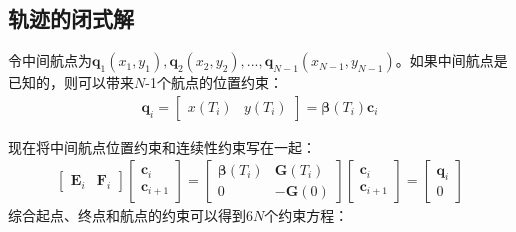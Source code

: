 \documentclass[master,academic]{ysuthesis} %
\begin{document}
		\subsection{轨迹的闭式解} 
		令中间航点为$\bm{q}_1(x_1,y_1),\bm{q}_2(x_2,y_2),...,\bm{q}_{N-1}(x_{N-1},y_{N-1})$。如果中间航点是已知的，则可以带来$N$-1个航点的位置约束：
		\begin{equation}
			\begin{aligned}
				\bm{q}_i = \begin{bmatrix}
					x(T_i)& y(T_i)
				\end{bmatrix} = \bm{\beta}(T_i)\bm{c}_i
			\end{aligned}
		\end{equation}
		
		现在将中间航点位置约束和连续性约束写在一起：
		\begin{equation}
			\begin{aligned}
				\begin{bmatrix}
					\bm{E}_i &\bm{F}_i
				\end{bmatrix}\begin{bmatrix}
					\bm{c}_i\\
					\bm{c}_{i+1}
				\end{bmatrix}=
				\begin{bmatrix}
					\bm{\beta} ( T_i )& \bm{G}( T_i ) \\
					0 & -\bm{G}( 0 )
				\end{bmatrix}\begin{bmatrix}
					\bm{c}_i\\
					\bm{c}_{i+1}
				\end{bmatrix}  =\begin{bmatrix}
					\bm{q}_i\\
					0
				\end{bmatrix}
			\end{aligned}
		\end{equation}
		综合起点、终点和航点的约束可以得到$6N$个约束方程：
\end{document}
